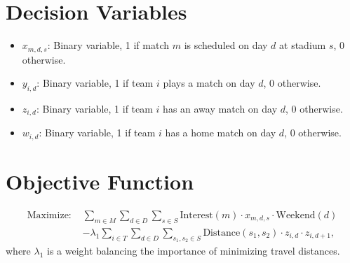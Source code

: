 \documentclass[a4paper, 12pt]{article}
\begin{document}
\section*{Decision Variables}
\begin{itemize}
    \item $x_{m,d,s}$: Binary variable, 1 if match $m$ is scheduled on day $d$ at stadium $s$, 0 otherwise.
    \item $y_{i,d}$: Binary variable, 1 if team $i$ plays a match on day $d$, 0 otherwise.
    \item $z_{i,d}$: Binary variable, 1 if team $i$ has an away match on day $d$, 0 otherwise.
    \item $w_{i,d}$: Binary variable, 1 if team $i$ has a home match on day $d$, 0 otherwise.
\end{itemize}

\section*{Objective Function}
\begin{align*}
\text{Maximize: } & \sum_{m \in M} \sum_{d \in D} \sum_{s \in S} \text{Interest}(m) \cdot x_{m,d,s} \cdot \text{Weekend}(d) \\
& - \lambda_1 \sum_{i \in T} \sum_{d \in D} \sum_{s_1, s_2 \in S} \text{Distance}(s_1, s_2) \cdot z_{i,d} \cdot z_{i,d+1},
\end{align*}
where $\lambda_1$ is a weight balancing the importance of minimizing travel distances.
\end{document}
